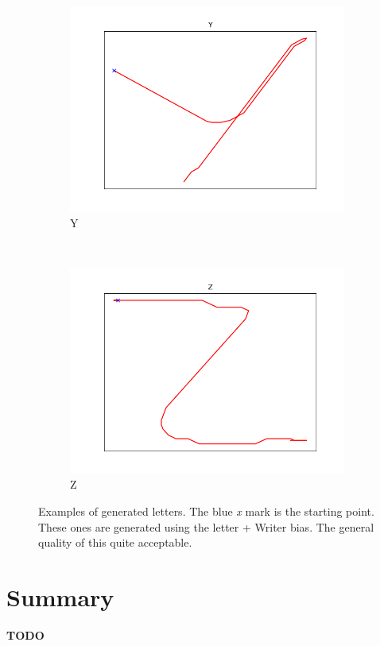 \begin{figure}
\begin{subfigure}[b]{0.14\textwidth}
        \includegraphics[width=\textwidth]{images/gbem/letters_generated/Y.png}
        \caption{Y}
    \end{subfigure}
    ~
    \begin{subfigure}[b]{0.14\textwidth}
        \includegraphics[width=\textwidth]{images/gbem/letters_generated/Z.png}
        \caption{Z}
    \end{subfigure}

    \caption{Examples of generated letters. The blue \textit{x} mark is the starting point. These ones are generated using the letter + Writer bias. The general quality of this quite acceptable.}\label{fig:letters_examples_gbem}
\end{figure}


\section{Summary}
\textbf{TODO}
